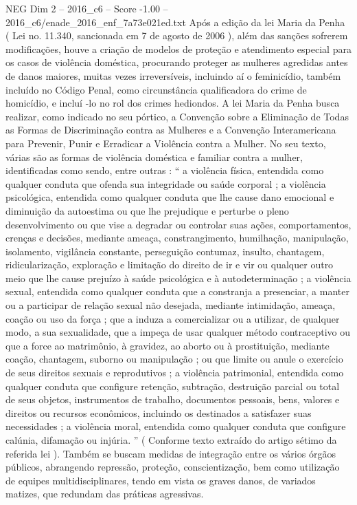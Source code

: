 \begin{textsample}{NEG Dim 2 – 2016\_c6 – Score -1.00 – 2016\_c6/enade\_2016\_enf\_7a73e021ed.txt}
Após a edição da lei Maria da Penha ( Lei no. 11.340, sancionada em 7 de agosto de 2006 ), além das sanções sofrerem modificações, houve a criação de modelos de proteção e atendimento especial para os casos de violência doméstica, procurando proteger as mulheres agredidas antes de danos maiores, muitas vezes irreversíveis, incluindo aí o feminicídio, também incluído no Código Penal, como circunstância qualificadora do crime de homicídio, e incluí -lo no rol dos crimes hediondos.
A lei Maria da Penha busca realizar, como indicado no seu pórtico, a Convenção sobre a Eliminação de Todas as Formas de Discriminação contra as Mulheres e a Convenção Interamericana para Prevenir, Punir e Erradicar a Violência contra a Mulher.
No seu texto, várias são as formas de violência doméstica e familiar contra a mulher, identificadas como sendo, entre outras : “ a violência física, entendida como qualquer conduta que ofenda sua integridade ou saúde corporal ; a violência psicológica, entendida como qualquer conduta que lhe cause dano emocional e diminuição da autoestima ou que lhe prejudique e perturbe o pleno desenvolvimento ou que vise a degradar ou controlar suas ações, comportamentos, crenças e decisões, mediante ameaça, constrangimento, humilhação, manipulação, isolamento, vigilância constante, perseguição contumaz, insulto, chantagem, ridicularização, exploração e limitação do direito de ir e vir ou qualquer outro meio que lhe cause prejuízo à saúde psicológica e à autodeterminação ; a violência sexual, entendida como qualquer conduta que a constranja a presenciar, a manter ou a participar de relação sexual não desejada, mediante intimidação, ameaça, coação ou uso da força ; que a induza a comercializar ou a utilizar, de qualquer modo, a sua sexualidade, que a impeça de usar qualquer método contraceptivo ou que a force ao matrimônio, à gravidez, ao aborto ou à prostituição, mediante coação, chantagem, suborno ou manipulação ; ou que limite ou anule o exercício de seus direitos sexuais e reprodutivos ; a violência patrimonial, entendida como qualquer conduta que configure retenção, subtração, destruição parcial ou total de seus objetos, instrumentos de trabalho, documentos pessoais, bens, valores e direitos ou recursos econômicos, incluindo os destinados a satisfazer suas necessidades ; a violência moral, entendida como qualquer conduta que configure calúnia, difamação ou injúria. ” ( Conforme texto extraído do artigo sétimo da referida lei ).
Também se buscam medidas de integração entre os vários órgãos públicos, abrangendo repressão, proteção, conscientização, bem como utilização de equipes multidisciplinares, tendo em vista os graves danos, de variados matizes, que redundam das práticas agressivas.

\end{textsample}
